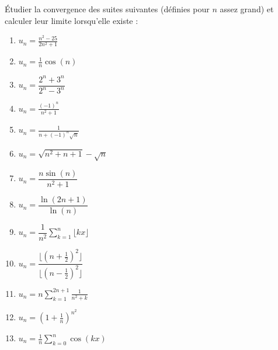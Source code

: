 \documentclass[solutions]{exercices}
\begin{document}

\begin{exercice}[\di]
	Étudier la convergence des suites suivantes (définies pour $n$ assez grand) et calculer leur limite lorsqu'elle existe :
	\begin{multicols}{3}
		\setlength{\columnsep}{-2.5cm}
		\begin{enumerate}
			\item $\displaystyle u_n = \frac{n^2-25}{2n^2+1}$
			\item $\displaystyle u_n =\frac{1}{n}\cos( n)$
			\item $\displaystyle u_n =\dfrac{2^n+3^n}{2^n-3^n}$
			\item $\displaystyle u_n=\frac{(-1)^n}{n^2+1}$
			\item $\displaystyle u_n=\frac{1}{n+(-1)^n\sqrt{n}}$
			\item $u_n=\sqrt{n^2 + n + 1}-\sqrt n$
			\item $u_n=\dfrac{n\sin (n)}{n^2 + 1}$
			\item $u_n=\dfrac{\ln(2n+1)}{\ln(n)}$
			\item $u_n=\dfrac{1}{n^2}\sum\limits_{k=1}^n\lfloor kx \rfloor$
			\item $u_n=\dfrac{\lfloor(n+\frac12)^2\rfloor}{\lfloor(n-\frac12)^2\rfloor}$
			\item $u_n=\displaystyle{}n\sum_{k = 1}^{2n + 1}\frac 1{n^2 + k}$
			\item $u_n=\displaystyle{}\left(1+\frac1n\right)^{n^2}$
			\item $u_n=\displaystyle{}\frac{1}{n}\sum_{k=0}^n \cos(kx)$
		\end{enumerate}
	\end{multicols}
\end{exercice}
\end{document}
